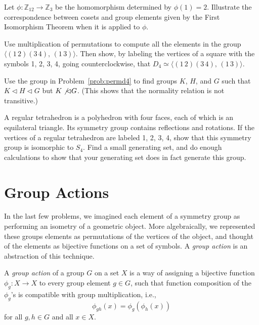 \begin{problem}
Let $\phi : \mathbb{Z}_{12} \longrightarrow \mathbb{Z}_{3}$ be the homomorphism determined by $\phi(1) = 2$.  Illustrate the correspondence between cosets and group elements given by the First Isomorphism Theorem when it is applied to $\phi$.
\end{problem}



\begin{problem}\label{prob:permd4}
Use multiplication of permutations to compute all the elements in the group $\langle (1\,2)(3\,4),\,(1\,3)\rangle$. Then show, by labeling the vertices of a square with the symbols 1, 2, 3, 4, going counterclockwise, that $D_4 \simeq \langle (1\,2)(3\,4),\,(1\,3)\rangle$.
\end{problem}



\begin{problem}
Use the group in Problem~\ref{prob:permd4} to find groups $K$, $H$, and $G$ such that $K \lhd H \lhd G$ but $K \not\lhd G$. (This shows that the normality relation is not transitive.)
\end{problem}



\begin{problem}\label{prob:tetgp}
A regular tetrahedron is a polyhedron with four faces, each of which is an equilateral triangle. Its symmetry group contains reflections and rotations. If the vertices of a regular tetrahedron are labeled 1, 2, 3, 4, show that this symmetry group is isomorphic to $S_4$. Find a small generating set, and do enough calculations to show that your generating set does in fact generate this group.
\end{problem}



\section{Group Actions}

In the last few problems, we imagined each element of a symmetry group as performing an isometry of a geometric object. More algebraically, we represented these groups elements as permutations of the vertices of the object, and thought of the elements as bijective functions on a set of symbols. A \textit{group action} is an abstraction of this technique.

\begin{definition}
 A \emph{group action} of a group $G$ on a set $X$ is a way of assigning a bijective function $\phi_g : X \longrightarrow X$ to every group element $g \in G$, such that function composition of the $\phi_g$'s is compatible with group multiplication, i.e.,
 $$\phi_{gh}(x) = \phi_g(\phi_h(x))$$
 for all $g,h \in G$ and all $x\in X$.
\end{definition}

